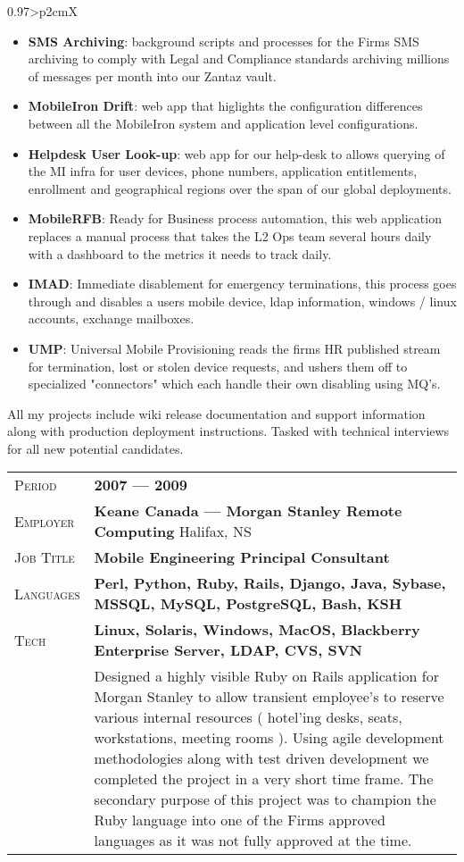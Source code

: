 \documentclass[a4paper, oneside, final]{scrartcl}
\newcommand{\gray}{\rowcolor[gray]{.90}}
\begin{document}
\begin{center}
\begin{tabularx}{0.97\linewidth}{>{\raggedleft\scshape}p{2cm}X}
\begin{itemize}
   \item \textbf{SMS Archiving}:  background scripts and processes for the Firms SMS archiving to comply with Legal and Compliance standards archiving millions of messages per month into our Zantaz vault.
   \item \textbf{MobileIron Drift}: web app that higlights the configuration differences between all the MobileIron system and application level configurations.
   \item \textbf{Helpdesk User Look-up}: web app for our help-desk to allows querying of the MI infra for user devices, phone numbers, application entitlements, enrollment and geographical regions over the span of our global deployments.
   \item \textbf{MobileRFB}: Ready for Business process automation, this web application replaces a manual process that takes the L2 Ops team several hours daily with a dashboard to the metrics it needs to track daily.
   \item \textbf{IMAD}: Immediate disablement for emergency terminations, this process goes through and disables a users mobile device, ldap information, windows / linux accounts, exchange mailboxes.
   \item \textbf{UMP}: Universal Mobile Provisioning reads the firms HR published stream for termination, lost or stolen device requests, and ushers them off to specialized "connectors" which each handle their own disabling using MQ's.
\end{itemize}
All my projects include wiki release documentation and support information along with production deployment instructions. Tasked with technical interviews for all new potential candidates.
\end{tabularx}



\vspace{12pt}

\begin{tabularx}{0.97\linewidth}{>{\raggedleft\scshape}p{2cm}X}
\gray Period & \textbf{2007 --- 2009}\\
\gray Employer & \textbf{Keane Canada --- Morgan Stanley Remote Computing} \hfill Halifax, NS\\
\gray Job Title & \textbf{Mobile Engineering Principal Consultant}\\
\gray Languages & \textbf{Perl, Python, Ruby, Rails, Django, Java, Sybase, MSSQL, MySQL, PostgreSQL, Bash, KSH}\\
\gray Tech & \textbf{Linux, Solaris, Windows, MacOS, Blackberry Enterprise Server, LDAP, CVS, SVN}\\
& Designed a highly visible Ruby on Rails application for Morgan Stanley to allow transient employee's to reserve various internal resources ( hotel'ing desks, seats, workstations, meeting rooms ). Using agile development methodologies along with test driven development we completed the project in a very short time frame.
The secondary purpose of this project was to champion the Ruby language into one of the Firms approved languages as it was not fully approved at the time.


\end{tabularx}
\end{center}
\end{document}
